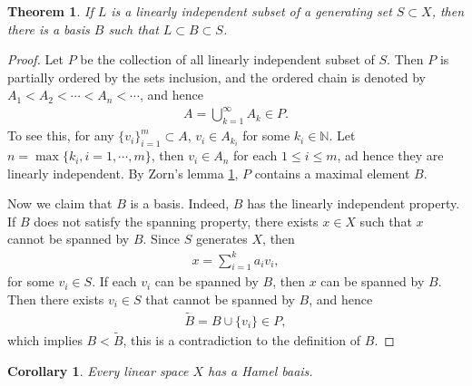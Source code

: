 \documentclass[10pt]{book}
\newtheorem{theorem}{Theorem}[chapter]
\newtheorem{corollary}{Corollary}[theorem]
\theoremstyle{definition}
\numberwithin{equation}{chapter}
\begin{document}
\begin{theorem}\label{th_157}
If $L$ is a linearly independent subset of a generating set $S \subset X$, then there is a basis $B$ such that $L \subset B \subset S$.
\end{theorem}
\begin{proof}
Let $P$ be the collection of all linearly independent subset of $S$. Then $P$ is partially ordered by the sets inclusion, and the ordered chain is denoted by $A_1 < A_2 < \cdots < A_n < \cdots$, and hence
\begin{align*}
    A = \bigcup^\infty_{k=1} A_k \in P.
\end{align*}
To see this, for any $\{v_i\}^m_{i=1} \subset A$, $v_i \in A_{k_i}$ for some $k_i \in \mathbb{N}$. Let $n = \max \{k_i, i = 1,\cdots,m\}$, then $v_i \in A_n$ for each $1 \leq i \leq m$, ad hence they are linearly independent. By Zorn's lemma \ref{th_157}, $P$ contains a maximal element $B$. 

Now we claim that $B$ is a basis. Indeed, $B$ has the linearly independent property. If $B$ does not satisfy the spanning property, there exists $x \in X$ such that $x$ cannot be spanned by $B$. Since $S$ generates $X$, then 
\begin{align*}
    x = \sum^k_{i=1} a_i v_i,
\end{align*}
for some $v_i \in S$. If each $v_i$ can be spanned by $B$, then $x$ can be spanned by $B$. Then there exists $v_i \in S$ that cannot be spanned by $B$, and hence
\begin{align*}
    \widetilde{B} = B \cup \{v_i\} \in P,
\end{align*}
which implies $B < \widetilde{B}$, this is a contradiction to the definition of $B$.
\end{proof}

\medskip

\begin{corollary}
Every linear space $X$ has a Hamel baais.
\end{corollary}

\medskip
\end{document}
